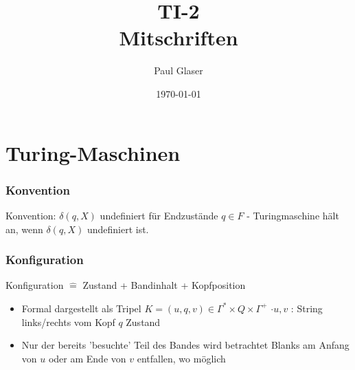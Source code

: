 \documentclass{report}
\title{\Huge{TI-2}\\Mitschriften}
\author{\huge{Paul Glaser}}
\date{\today}
\begin{document}
\nocite{*}

\maketitle
\newpage%
\tableofcontents
\chapter{Turing-Maschinen}
\subsection*{Konvention}
Konvention: $\delta(q, X)$ undefiniert für Endzustände $q \in F$ - Turingmaschine hält an, wenn $\delta(q, X)$ undefiniert ist.
\subsection*{Konfiguration}
Konfiguration $\hat{=}$ Zustand + Bandinhalt + Kopfposition
\newline
\begin{itemize}
	\item Formal dargestellt als Tripel $K=(u, q, v) \in \Gamma^* \times Q \times \Gamma^{+}$
	$\cdot u, v$ : String links/rechts vom Kopf $q$ Zustand
	\item Nur der bereits 'besuchte' Teil des Bandes wird betrachtet
	Blanks am Anfang von $u$ oder am Ende von $v$ entfallen, wo möglich
\end{itemize}
\end{document}
